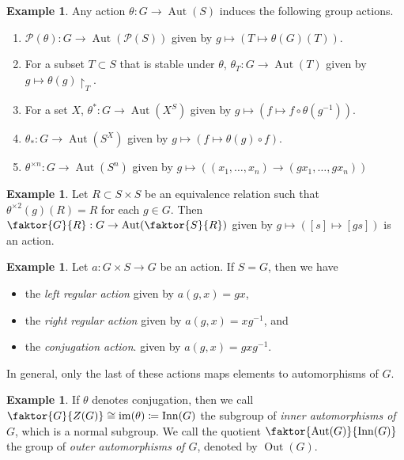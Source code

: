 \documentclass[10pt,letterpaper,cm]{nupset}
\theoremstyle{definition}
\newtheorem{exmp}[definition]{Example}
\theoremstyle{theorem}
\theoremstyle{remark}
\newcommand{\1}{\mathbf{1}}
\newcommand{\0}{\vec 0}
\DeclareMathOperator{\aut}{Aut}
\DeclareMathOperator{\inn}{Inn}
\DeclareMathOperator{\out}{Out}
\DeclareMathOperator{\im}{im}
\begin{document}
\theoremstyle{exmp}
\begin{exmp}{Any action $\theta : G \to \aut(S)$ induces the following group actions.}


\begin{enumerate}
\item $\mathcal{P}(\theta) : G \to \aut(\mathcal{P}(S))$ given by $g \mapsto (T \mapsto \theta(G)(T))$.
\item For a subset $T \subset S$ that is stable under $\theta$, $\theta_T : G \to \aut(T)$ given by $g \mapsto \theta(g)\restriction_T$.
\item For a set $X$, $\theta^\ast : G \to \aut(X^S)$ given by $g \mapsto (f \mapsto f \circ \theta(g^{-1}))$.
\item $\theta_{\ast}: G \to \aut(S^X)$ given by $g\mapsto (f \mapsto \theta(g) \circ f)$.
\item $\theta^{\times n} : G \to \aut(S^n)$ given by $g \mapsto ((x_1, \ldots, x_n) \to (gx_1, \ldots, gx_n))$

\end{enumerate}

\end{exmp}

\begin{exmp}
Let $R\subset S \times S$ be an equivalence relation such that $\theta^{\times 2}(g)(R) = R$ for each $g 
\in G$. Then $\faktor{G}{R}: G \to \aut(\faktor{S}{R})$ given by $g \mapsto ([s] \mapsto [gs])$ is an action.
\end{exmp}

\begin{exmp}
Let $a : G \times S \to G$ be an action. If $S = G$, then we have 
\begin{itemize}
\item the \textit{left regular action} given by $a(g, x) = gx$, 
\item the \textit{right regular action} given by $a(g, x) = xg^{-1}$, and 
\item the \textit{conjugation action}. given by $a(g, x) = gx g^{-1}$.
\end{itemize}
In general, only the last of these actions maps elements to automorphisms of $G$.
\end{exmp}

\begin{exmp}
If $\theta$ denotes conjugation, then we call $\faktor{G}{Z(G)} \cong \im(\theta)\coloneqq  \inn(G)$ the subgroup of \textit{inner automorphisms of $G$}, which is a normal subgroup. We call the quotient $\faktor{\aut(G)}{\inn(G)}$ the group of \textit{outer automorphisms of $G$}, denoted by $\out(G)$.
\end{exmp}
\end{document}
